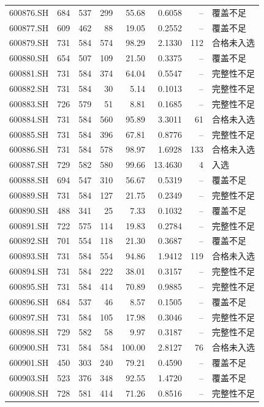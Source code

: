 \documentclass[10pt,a4paper]{article}
\begin{document}
\begin{longtable}{lrrr r r r l}
600876.SH & 684 & 537 & 299 & 55.68 & 0.6058 & -- & 覆盖不足\\
600877.SH & 609 & 462 & 88 & 19.05 & 0.2552 & -- & 覆盖不足\\
600879.SH & 731 & 584 & 574 & 98.29 & 2.1330 & 112 & 合格未入选\\
600880.SH & 654 & 507 & 109 & 21.50 & 0.3375 & -- & 覆盖不足\\
600881.SH & 731 & 584 & 374 & 64.04 & 0.5547 & -- & 完整性不足\\
600882.SH & 731 & 584 & 30 & 5.14 & 0.1013 & -- & 完整性不足\\
600883.SH & 726 & 579 & 51 & 8.81 & 0.1685 & -- & 完整性不足\\
600884.SH & 731 & 584 & 560 & 95.89 & 3.3011 & 61 & 合格未入选\\
600885.SH & 731 & 584 & 396 & 67.81 & 0.8776 & -- & 完整性不足\\
600886.SH & 731 & 584 & 578 & 98.97 & 1.6928 & 133 & 合格未入选\\
600887.SH & 729 & 582 & 580 & 99.66 & 13.4630 & 4 & 入选\\
600888.SH & 694 & 547 & 310 & 56.67 & 0.5319 & -- & 覆盖不足\\
600889.SH & 731 & 584 & 127 & 21.75 & 0.2349 & -- & 完整性不足\\
600890.SH & 488 & 341 & 25 & 7.33 & 0.1032 & -- & 覆盖不足\\
600891.SH & 722 & 575 & 114 & 19.83 & 0.2784 & -- & 完整性不足\\
600892.SH & 701 & 554 & 118 & 21.30 & 0.3687 & -- & 覆盖不足\\
600893.SH & 731 & 584 & 554 & 94.86 & 1.9412 & 119 & 合格未入选\\
600894.SH & 731 & 584 & 222 & 38.01 & 0.3157 & -- & 完整性不足\\
600895.SH & 731 & 584 & 414 & 70.89 & 0.9885 & -- & 完整性不足\\
600896.SH & 684 & 537 & 46 & 8.57 & 0.1505 & -- & 覆盖不足\\
600897.SH & 731 & 584 & 105 & 17.98 & 0.3046 & -- & 完整性不足\\
600898.SH & 729 & 582 & 58 & 9.97 & 0.3187 & -- & 完整性不足\\
600900.SH & 731 & 584 & 584 & 100.00 & 2.8127 & 76 & 合格未入选\\
600901.SH & 450 & 303 & 240 & 79.21 & 0.4590 & -- & 覆盖不足\\
600903.SH & 523 & 376 & 348 & 92.55 & 1.4720 & -- & 覆盖不足\\
600908.SH & 728 & 581 & 414 & 71.26 & 0.8516 & -- & 完整性不足\\

\end{longtable}
\end{document}
